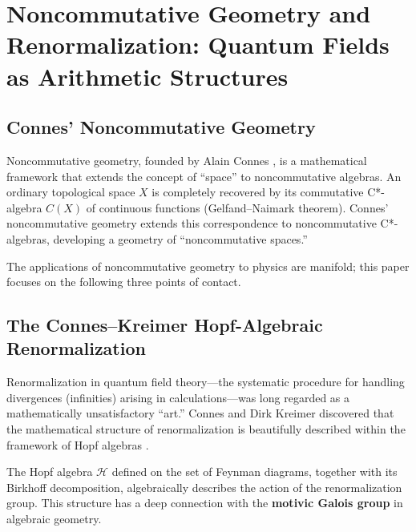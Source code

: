 \documentclass[12pt,a4paper]{article}
\theoremstyle{definition}
\begin{document}
\newpage
\section{Noncommutative Geometry and Renormalization: Quantum Fields as Arithmetic Structures}
\label{sec:noncommutative}

\subsection{Connes' Noncommutative Geometry}

Noncommutative geometry, founded by Alain Connes \cite{Connes1994}, is a mathematical framework that extends the concept of ``space'' to noncommutative algebras. An ordinary topological space $X$ is completely recovered by its commutative C*-algebra $C(X)$ of continuous functions (Gelfand--Naimark theorem). Connes' noncommutative geometry extends this correspondence to noncommutative C*-algebras, developing a geometry of ``noncommutative spaces.''

The applications of noncommutative geometry to physics are manifold; this paper focuses on the following three points of contact.

\subsection{The Connes--Kreimer Hopf-Algebraic Renormalization}

Renormalization in quantum field theory---the systematic procedure for handling divergences (infinities) arising in calculations---was long regarded as a mathematically unsatisfactory ``art.'' Connes and Dirk Kreimer discovered that the mathematical structure of renormalization is beautifully described within the framework of Hopf algebras \cite{ConnesKreimer1998, ConnesKreimer2000, ConnesKreimer2001}.

\begin{keyinsight}
The Hopf algebra $\mathcal{H}$ defined on the set of Feynman diagrams, together with its Birkhoff decomposition, algebraically describes the action of the renormalization group. This structure has a deep connection with the \textbf{motivic Galois group} in algebraic geometry.
\end{keyinsight}
\end{document}
